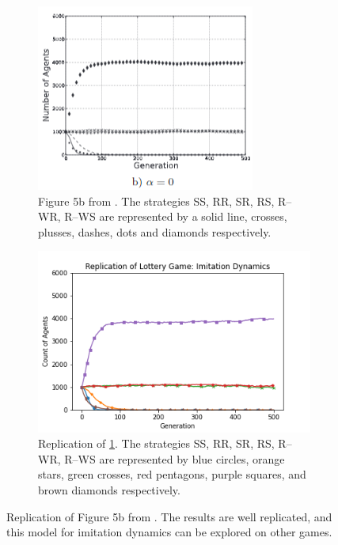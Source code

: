 \FloatBarrier 
\begin{figure}[!h]
  \begin{subfigure}[b]{0.45\textwidth}
    \includegraphics[width=\textwidth]{images/lottery2.png}
    \caption{Figure 5b from \cite{RN30}. The strategies SS, RR, SR, RS, R--WR, R--WS are represented by a solid line, crosses, plusses, dashes, dots and diamonds respectively. }
    \label{lottery2}
  \end{subfigure}
  \hfill
  \begin{subfigure}[b]{0.45\textwidth}
    \includegraphics[width=1.25\textwidth]{images/lottery2_me.png}
    \caption{Replication of \ref{lottery2}. The strategies SS, RR, SR, RS, R--WR, R--WS are represented by blue circles, orange stars, green crosses, red pentagons, purple squares, and brown diamonds respectively. }
    \label{lottery2_me}
  \end{subfigure}
  \caption{Replication of Figure 5b from \cite{RN30}. The results are well replicated, and this model for imitation dynamics can be explored on other games.} \label{lottery_comp1}
\end{figure} 
\FloatBarrier



